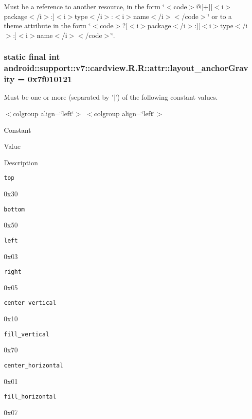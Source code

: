 Must be a reference to another resource, in the form \char`\"{}$<$code$>$@\mbox{[}+\mbox{]}\mbox{[}$<$i$>$package$<$/i$>$:\mbox{]}$<$i$>$type$<$/i$>$:$<$i$>$name$<$/i$>$$<$/code$>$\char`\"{} or to a theme attribute in the form \char`\"{}$<$code$>$?\mbox{[}$<$i$>$package$<$/i$>$:\mbox{]}\mbox{[}$<$i$>$type$<$/i$>$:\mbox{]}$<$i$>$name$<$/i$>$$<$/code$>$\char`\"{}. \hypertarget{classandroid_1_1support_1_1v7_1_1cardview_1_1_r_1_1attr_8b3d3f7764b7a258abf0e4c73c4db21c}{
\subsubsection[{layout\_\-anchorGravity}]{\setlength{\rightskip}{0pt plus 5cm}static final int android::support::v7::cardview.R.R::attr::layout\_\-anchorGravity = 0x7f010121}}
\label{classandroid_1_1support_1_1v7_1_1cardview_1_1_r_1_1attr_8b3d3f7764b7a258abf0e4c73c4db21c}


Must be one or more (separated by '$|$') of the following constant values. \begin{TabularC}{0}
\hline
\end{TabularC}
$<$colgroup align=\char`\"{}left\char`\"{}$>$ $<$colgroup align=\char`\"{}left\char`\"{}$>$ 

Constant

Value

Description 

{\tt top}

0x30

{\tt bottom}

0x50

{\tt left}

0x03

{\tt right}

0x05

{\tt center\_\-vertical}

0x10

{\tt fill\_\-vertical}

0x70

{\tt center\_\-horizontal}

0x01

{\tt fill\_\-horizontal}

0x07

